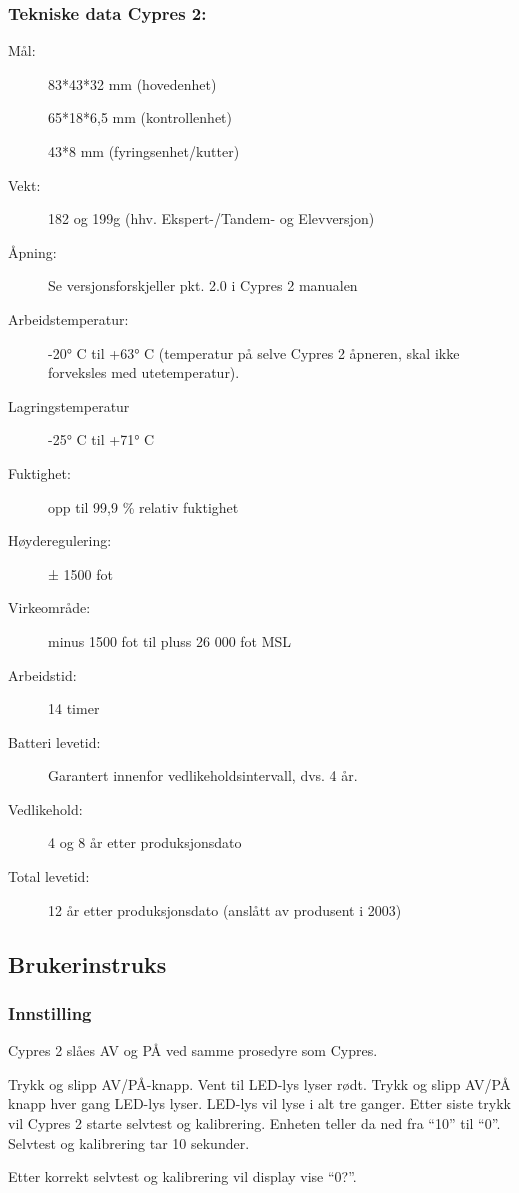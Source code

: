 \subsubsection{Tekniske data Cypres 2:}
\begin{description}
\item[Mål:] 83*43*32 mm (hovedenhet)

65*18*6,5 mm (kontrollenhet)

43*8 mm (fyringsenhet/kutter)

\item[Vekt:] 182 og 199g (hhv. Ekspert-/Tandem- og Elevversjon)
\item[Åpning:] Se versjonsforskjeller pkt. 2.0 i Cypres 2 manualen
\item[Arbeidstemperatur:] -20° C til +63° C (temperatur på selve Cypres 2 åpneren, skal ikke forveksles med utetemperatur).
\item[Lagringstemperatur] -25° C til +71° C
\item[Fuktighet:] opp til 99,9 \% relativ fuktighet
\item[Høyderegulering:] ± 1500 fot
\item[Virkeområde:] minus 1500 fot til pluss 26 000 fot MSL
\item[Arbeidstid:] 14 timer
\item[Batteri levetid:] Garantert innenfor vedlikeholdsintervall, dvs. 4 år.
\item[Vedlikehold:] 4 og 8 år etter produksjonsdato
\item[Total levetid:] 12 år etter produksjonsdato (anslått av produsent i 2003)
\end{description}

\subsection{Brukerinstruks}
\subsubsection{Innstilling}
Cypres 2 slåes AV og PÅ ved samme prosedyre som Cypres.

Trykk og slipp AV/PÅ-knapp. Vent til LED-lys lyser rødt. Trykk og slipp AV/PÅ knapp hver gang LED-lys lyser. LED-lys vil lyse i alt tre ganger. Etter siste trykk vil Cypres 2 starte selvtest og kalibrering. Enheten teller da ned fra ``10'' til ``0''. Selvtest og kalibrering tar 10 sekunder.

Etter korrekt selvtest og kalibrering vil display vise ``0?''.

